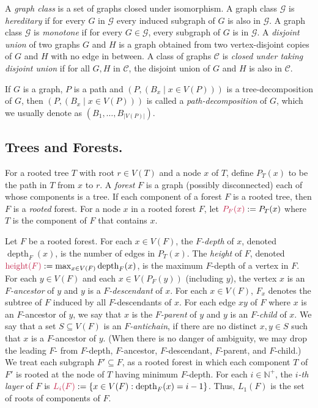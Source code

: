 \documentclass[twoside,leqno]{article}
\makeatletter
\newcommand{\N}{\mathbb{N}}
\newcommand{\defin}[1]{\emph{\textcolor{brightmaroon}{#1}}}
\def\mathcolor#1#{\@mathcolor{#1}}
\def\@mathcolor#1#2#3{%
  \protect\leavevmode
  \begingroup
    \color#1{#2}#3%
  \endgroup
}
\newcommand{\mathdefin}[1]{\mathcolor{brightmaroon}{#1}}
\DeclareMathOperator{\height}{height}
\DeclareMathOperator{\depth}{depth}
\makeatother
\begin{document}
A \defin{graph class} is a set of graphs closed under isomorphism. A graph class  $\mathcal{G}$ is \defin{hereditary} if for every $G$ in $\mathcal{G}$ every induced subgraph of $G$ is also in $\mathcal{G}$. A  graph class $\mathcal{G}$ is \defin{monotone} if for every $G\in\mathcal{G}$, every subgraph of $G$ is in $\mathcal{G}$. 
 A \defin{disjoint union} of two graphs $G$ and $H$ is a graph obtained from two vertex-disjoint copies of $G$ and $H$ with no edge in between. A class of graphs $\mathcal{C}$ is \defin{closed under taking disjoint union} if for all $G,H$ in $\mathcal{C}$, the disjoint union of $G$ and $H$ is also in $\mathcal{C}$.

If $G$ is a graph, $P$ is a path and $(P,(B_x\mid x \in V(P)))$ is a tree-decomposition of $G$, then $(P,(B_x\mid x \in V(P)))$ is called a \defin{path-decomposition} of $G$, which we usually denote as $(B_1,\ldots,B_{|V(P)|})$.

\subsection{Trees and Forests.}

For a rooted tree $T$ with root $r\in V(T)$ and a node $x$ of $T$, define \defin{$P_T(x)$} to be the path in $T$ from $x$ to $r$.    A \defin{forest} $F$ is a graph (possibly disconnected) each of whose components is a tree.  If each component of a forest $F$ is a rooted tree, then $F$ is a \defin{rooted} forest. For a node $x$ in a rooted forest $F$, let $\mathdefin{P_F(x)}:=P_T(x)$ where $T$ is the component of $F$ that contains $x$.

Let $F$ be a rooted forest.  For each $x\in V(F)$, the \defin{$F$-depth} of $x$, denoted \defin{$\depth_F(x)$}, is the number of edges in $P_T(x)$. The \defin{height} of $F$, denoted $\mathdefin{\height(F)}:=\max_{x\in V(F)}\depth_F(x)$, is the maximum $F$-depth of a vertex in $F$. For each $y\in V(F)$ and each $x\in V(P_F(y))$ (including $y$),  the vertex $x$ is an \defin{$F$-ancestor} of $y$ and $y$ is a \defin{$F$-descendant} of $x$.  For each $x\in V(F)$, \defin{$F_x$} denotes the subtree of $F$ induced by all $F$-descendants of $x$. For each edge $xy$ of $F$ where $x$ is an $F$-ancestor of $y$, we say that $x$ is the \defin{$F$-parent} of $y$ and $y$ is an \defin{$F$-child} of $x$. We say that a set $S\subseteq V(F)$ is an \defin{$F$-antichain}, if there are no distinct $x,y\in S$ such that $x$ is a $F$-ancestor of $y$.  (When there is no danger of ambiguity, we may drop the leading $F$- from $F$-depth, $F$-ancestor, $F$-descendant, $F$-parent, and $F$-child.) We treat each subgraph $F'\subseteq F$, as a rooted forest in which each component $T$ of $F'$ is rooted at the node of $T$ having minimum $F$-depth.  For each $i\in\N^+$, the \defin{$i$-th layer} of $F$ is $\mathdefin{L_i(F)}:=\{x\in V(F):\depth_F(x)=i-1\}$. Thus, $L_1(F)$ is the set of roots of components of $F$.
\end{document}
